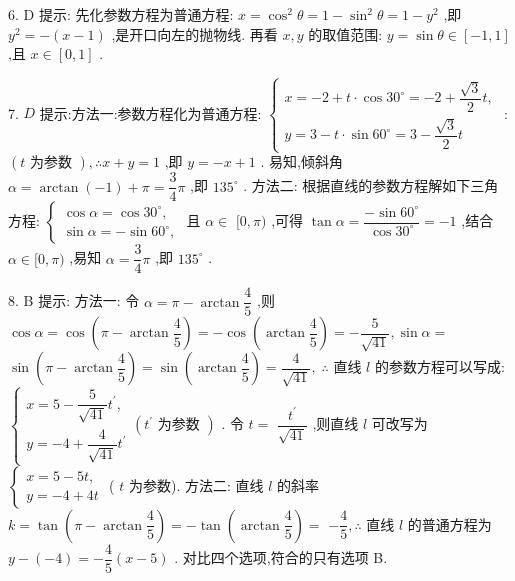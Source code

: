 6. D 提示: 先化参数方程为普通方程: $x = {\cos }^{2}\theta  = 1 - {\sin }^{2}\theta  = 1 - {y}^{2}$ ,即 ${y}^{2} =  - \left( {x - 1}\right)$ ,是开口向左的抛物线. 再看 $x,y$ 的取值范围: $y = \sin \theta  \in  \left\lbrack  {-1,1}\right\rbrack$ ,且 $x \in  \left\lbrack  {0,1}\right\rbrack$ .

7. $D$ 提示:方法一:参数方程化为普通方程: $\left\{  \begin{array}{l} x =  - 2 + t \cdot  \cos {30}^{ \circ  } =  - 2 + \dfrac{\sqrt{3}}{2}t, \\  y = 3 - t \cdot  \sin {60}^{ \circ  } = 3 - \dfrac{\sqrt{3}}{2}t \end{array}\right.$ : $\left( {t\text{ 为参数 }}\right) ,\therefore x + y = 1$ ,即 $y =  - x + 1$ . 易知,倾斜角 $\alpha  = \arctan \left( {-1}\right)  + \pi  = \dfrac{3}{4}\pi$ ,即 ${135}^{ \circ  }$ . 方法二: 根据直线的参数方程解如下三角方程: $\left\{  \begin{array}{l} \cos \alpha  = \cos {30}^{ \circ  }, \\  \sin \alpha  =  - \sin {60}^{ \circ  }, \end{array}\right.$ 且 $\alpha  \in$  $\lbrack 0,\pi )$ ,可得 $\tan \alpha  = \dfrac{-\sin {60}^{ \circ  }}{\cos {30}^{ \circ  }} =  - 1$ ,结合 $\alpha  \in  \lbrack 0,\pi )$ ,易知 $\alpha  = \dfrac{3}{4}\pi$ ,即 ${135}^{ \circ  }$ .

8. B 提示: 方法一: 令 $\alpha  = \pi  - \arctan \dfrac{4}{5}$ ,则 $\cos \alpha  = \cos \left( {\pi  - \arctan \dfrac{4}{5}}\right)  =  - \cos \left( {\arctan \dfrac{4}{5}}\right)  =  - \dfrac{5}{\sqrt{41}},\sin \alpha  =$  $\sin \left( {\pi  - \arctan \dfrac{4}{5}}\right)  = \sin \left( {\arctan \dfrac{4}{5}}\right)  = \dfrac{4}{\sqrt{41}},\;\therefore$ 直线 $l$ 的参数方程可以写成: $\left\{  {\begin{array}{l} x = 5 - \dfrac{5}{\sqrt{41}}{t}^{\prime }, \\  y =  - 4 + \dfrac{4}{\sqrt{41}}{t}^{\prime } \end{array}\left( {{t}^{\prime }\text{ 为参数 }}\right) \text{ . 令 }t = }\right.$  $\dfrac{{t}^{\prime }}{\sqrt{41}}$ ,则直线 $l$ 可改写为 $\left\{  \begin{array}{l} x = 5 - {5t}, \\  y =  - 4 + {4t} \end{array}\right.$ ( $t$ 为参数). 方法二: 直线 $l$ 的斜率 $k = \tan \left( {\pi  - \arctan \dfrac{4}{5}}\right)  =  - \tan \left( {\arctan \dfrac{4}{5}}\right)  =$  $- \dfrac{4}{5},\therefore$ 直线 $l$ 的普通方程为 $y - \left( {-4}\right)  =  - \dfrac{4}{5}\left( {x - 5}\right)$ . 对比四个选项,符合的只有选项 B.

